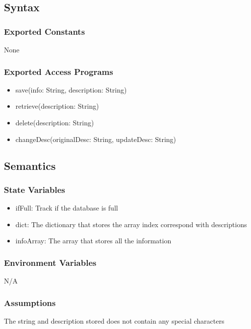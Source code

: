 \documentclass[12pt, titlepage]{article}
\begin{document}
\subsection{Syntax}

\subsubsection{Exported Constants}
\hspace{1.5em}None

\subsubsection{Exported Access Programs}

\begin{itemize}
\item save(info: String, description: String)
\item retrieve(description: String)
\item delete(description: String)
\item changeDesc(originalDesc: String, updateDesc: String)
\end{itemize}

\subsection{Semantics}

\subsubsection{State Variables}
\begin{itemize}
\item ifFull: Track if the database is full
\item dict: The dictionary that stores the array index correspond with descriptions
\item infoArray: The array that stores all the information
\end{itemize}

\subsubsection{Environment Variables}
\hspace{1.5em}N/A

\subsubsection{Assumptions}
\hspace{1.5em}The string and description stored does not contain any special characters
\end{document}
